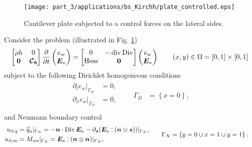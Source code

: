 \begin{figure}[t]
	\centering
	\texttt{[image: part\_3/applications/bs\_Kirchh/plate\_controlled.eps]}
	\caption{Cantilever plate subjected to a control forces on the lateral sides.}
	\label{fig:plate_controlled}
\end{figure}

Consider the problem (illustrated in Fig. \ref{fig:plate_controlled})
\begin{equation*}
\begin{bmatrix}
\rho h & 0 \\ 
\bm{0} & \bm{\mathcal{C}_b} \\
\end{bmatrix}
\diffp{}{t}
\begin{pmatrix}
e_w \\ \bm{E}_\kappa \\
\end{pmatrix} = 
\begin{bmatrix}
0 & -\div\Div \\ 
\Hess & \bm{0} \\
\end{bmatrix}
\begin{pmatrix}
e_w \\ \bm{E}_\kappa \\
\end{pmatrix} \qquad (x, y) \in \Omega = [0, 1]\times[0,1]
\end{equation*}
subject to the following Dirichlet homogeneous conditions
\begin{align*}
\begin{aligned}
\partial_t e_w|_{\Gamma_D} &= 0, \\
\partial_x e_w|_{\Gamma_D} &= 0, \\
\end{aligned} \qquad {\Gamma_D} &= \left\{x = 0 \right\},
\end{align*}
and Neumann boundary control
\begin{align*}
\begin{aligned}
u_{\partial, q} & = \widetilde{q}_n|_{\Gamma_N} = -\bm{n} \cdot \Div \bm{E}_\kappa - \partial_{\bm{s}} (\bm{E}_\kappa \cddot (\bm{n} \otimes \bm{s}))|_{\Gamma_N},\\
u_{\partial, m} &= M_{nn}|_{\Gamma_N} =\bm{E}_\kappa \cddot (\bm{n}\otimes \bm{n})|_{\Gamma_N}, \; \\
\end{aligned} \qquad {\Gamma_N} &= \left\{y = 0 \cup x=1 \cup y=1 \right\}.
\end{align*}
